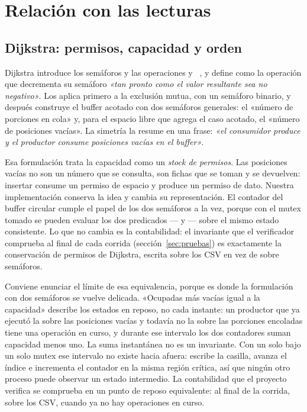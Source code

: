 \section{Relación con las lecturas}
\label{sec:lecturas}

\subsection{Dijkstra: permisos, capacidad y orden}

Dijkstra introduce los semáforos y las operaciones  y
~\cite{Dijkstra1965}, y define  como la operación que
decrementa su semáforo \emph{«tan pronto como el valor resultante sea no
negativo»}. Los aplica primero a la exclusión mutua, con un semáforo
binario, y después construye el buffer acotado con dos semáforos generales:
el «número de porciones en cola» y, para el espacio libre que agrega el caso
acotado, el «número de posiciones vacías». La simetría la resume en una
frase: \emph{«el consumidor produce y el productor consume posiciones vacías
en el buffer»}.

Esa formulación trata la capacidad como un \emph{stock de permisos}. Las
posiciones vacías no son un número que se consulta, son fichas que se
toman y se devuelven: insertar consume un permiso de espacio y produce un
permiso de dato. Nuestra implementación conserva la idea y cambia su
representación. El contador  del buffer circular cumple el
papel de los dos semáforos a la vez, porque con el mutex tomado se pueden
evaluar los dos predicados ---  y 
--- sobre el mismo estado consistente. Lo que no cambia es la contabilidad:
el invariante  que el verificador
comprueba al final de cada corrida (sección~\ref{sec:pruebas}) es
exactamente la conservación de permisos de Dijkstra, escrita sobre los CSV
en vez de sobre semáforos.

Conviene enunciar el límite de esa equivalencia, porque es donde la
formulación con dos semáforos se vuelve delicada. «Ocupadas más vacías igual
a la capacidad» describe los estados en reposo, no cada instante: un
productor que ya ejecutó la  sobre las posiciones vacías y todavía
no la  sobre las porciones encoladas tiene una operación en curso, y
durante ese intervalo los dos contadores suman capacidad menos uno. La suma
instantánea no es un invariante. Con un solo  bajo un solo mutex
ese intervalo no existe hacia afuera:  escribe la casilla,
avanza el índice e incrementa el contador en la misma región crítica, así
que ningún otro proceso puede observar un estado intermedio. La contabilidad
que el proyecto verifica se comprueba en un punto de reposo equivalente: al
final de la corrida, sobre los CSV, cuando ya no hay operaciones en curso.

